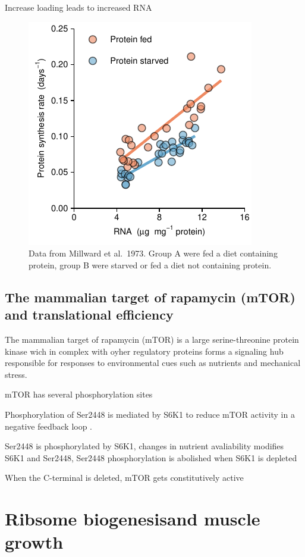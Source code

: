 \documentclass[twoside,10pt]{gihclass} %
\begin{document}
Increase loading leads to increased RNA
\begin{figure}
\centering
\includegraphics{thesis_files/figure-latex/Millward1973-1.pdf}
\caption{\label{fig:Millward1973}Data from Millward et al.~1973. Group A were fed a diet containing protein, group B were starved or fed a diet not containing protein.}
\end{figure}
\hypertarget{the-mammalian-target-of-rapamycin-mtor-and-translational-efficiency}{%
\subsection{The mammalian target of rapamycin (mTOR) and translational efficiency}\label{the-mammalian-target-of-rapamycin-mtor-and-translational-efficiency}}

The mammalian target of rapamycin (mTOR) is a large serine-threonine protein kinase wich in complex with oyher regulatory proteins forms a signaling hub responsible for responses to environmental cues such as nutrients and mechanical stress.

mTOR has several phosphorylation sites

Phosphorylation of Ser2448 is mediated by S6K1 to reduce mTOR activity in a negative feedback loop .

Ser2448 is phosphorylated by S6K1, changes in nutrient avaliability modifies S6K1 and Ser2448, Ser2448 phosphorylation is abolished when S6K1 is depleted

When the C-terminal is deleted, mTOR gets constitutively active

\hypertarget{ribsome-biogenesisand-muscle-growth}{%
\section{Ribsome biogenesisand muscle growth}\label{ribsome-biogenesisand-muscle-growth}}
\end{document}
